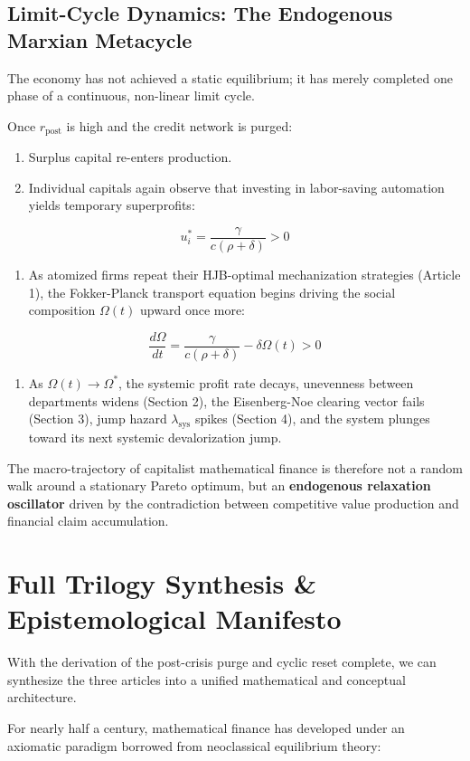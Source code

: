\documentclass[11pt,letterpaper]{report}
\begin{document}
\subsection{Limit-Cycle Dynamics: The Endogenous Marxian Metacycle}
The economy has not achieved a static equilibrium; it has merely completed one phase of a continuous, non-linear limit cycle.

Once ${r}_{\mathrm{post}}$ is high and the credit network is purged:

\begin{enumerate}
\item Surplus capital re-enters production.
\item Individual capitals again observe that investing in labor-saving automation yields temporary superprofits:
\end{enumerate}
\[
{u}_{i}^{*}=\frac{\gamma }{c(\rho +\delta )}>0
\]
\begin{enumerate}
\item As atomized firms repeat their HJB-optimal mechanization strategies (Article 1), the Fokker-Planck transport equation begins driving the social composition $\Omega (t)$ upward once more:
\end{enumerate}
\[
\frac{d\Omega }{dt}=\frac{\gamma }{c(\rho +\delta )}-\delta \Omega (t)>0
\]
\begin{enumerate}
\item As $\Omega (t)\rightarrow {\Omega }^{*}$, the systemic profit rate decays, unevenness between departments widens (Section 2), the Eisenberg-Noe clearing vector fails (Section 3), jump hazard ${\lambda }_{\mathrm{sys}}$ spikes (Section 4), and the system plunges toward its next systemic devalorization jump.
\end{enumerate}
The macro-trajectory of capitalist mathematical finance is therefore not a random walk around a stationary Pareto optimum, but an \textbf{endogenous relaxation oscillator} driven by the contradiction between competitive value production and financial claim accumulation.

\section{Full Trilogy Synthesis \& Epistemological Manifesto}
With the derivation of the post-crisis purge and cyclic reset complete, we can synthesize the three articles into a unified mathematical and conceptual architecture.

For nearly half a century, mathematical finance has developed under an axiomatic paradigm borrowed from neoclassical equilibrium theory:
\end{document}
